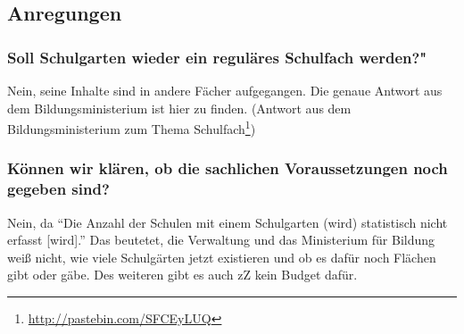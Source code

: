\subsection{Anregungen}

\subsubsection{Soll Schulgarten wieder ein reguläres Schulfach werden?"}

Nein, seine Inhalte sind in andere Fächer aufgegangen. Die genaue Antwort aus dem Bildungsministerium ist hier zu finden. (Antwort aus dem Bildungsministerium zum Thema Schulfach\footnote{\url{http://pastebin.com/SFCEyLUQ}})

\subsubsection{Können wir klären, ob die sachlichen Voraussetzungen noch gegeben sind?}

Nein, da ``Die Anzahl der Schulen mit einem Schulgarten (wird) statistisch nicht erfasst {[}wird{]}.'' Das beutetet, die Verwaltung und das Ministerium für Bildung weiß nicht, wie viele Schulgärten jetzt existieren und ob es dafür noch Flächen gibt oder gäbe. Des weiteren gibt es auch zZ kein Budget dafür.
